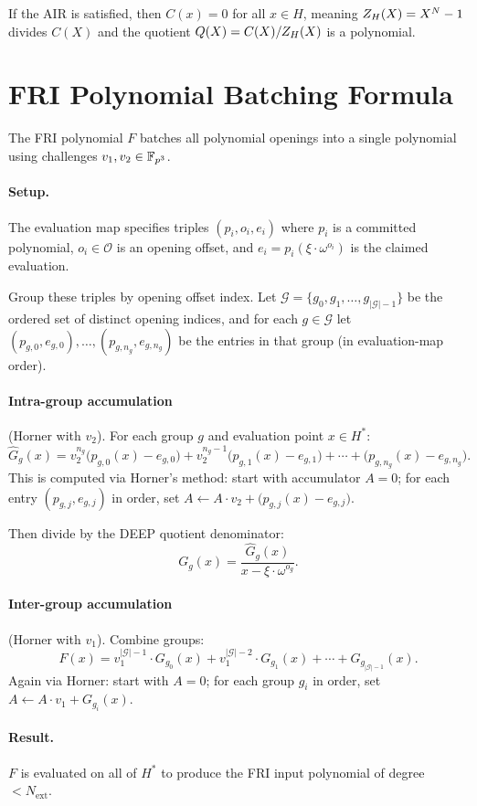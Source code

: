If the AIR is satisfied, then $C(x) = 0$ for all $x \in H$,
meaning $Z_H(X) = X^N - 1$ divides $C(X)$ and
the quotient $Q(X) = C(X)/Z_H(X)$ is a polynomial.

\section{FRI Polynomial Batching Formula}
\label{app:batching}

The FRI polynomial $F$ batches all polynomial openings into a single polynomial
using challenges $v_1, v_2 \in \mathbb{F}_{p^3}$.

\paragraph{Setup.}
The evaluation map specifies triples $(p_i, o_i, e_i)$ where
$p_i$ is a committed polynomial,
$o_i \in \mathcal{O}$ is an opening offset, and
$e_i = p_i(\xi \cdot \omega^{o_i})$ is the claimed evaluation.

Group these triples by opening offset index.
Let $\mathcal{G} = \{g_0, g_1, \ldots, g_{|\mathcal{G}|-1}\}$
be the ordered set of distinct opening indices,
and for each $g \in \mathcal{G}$ let
$(p_{g,0}, e_{g,0}), \ldots, (p_{g,n_g}, e_{g,n_g})$
be the entries in that group (in evaluation-map order).

\paragraph{Intra-group accumulation} (Horner with $v_2$).
For each group $g$ and evaluation point $x \in H^*$:
\begin{equation}
  \label{eq:intra-group}
  \hat{G}_g(x)
  = v_2^{n_g}\bigl(p_{g,0}(x) - e_{g,0}\bigr)
  + v_2^{n_g-1}\bigl(p_{g,1}(x) - e_{g,1}\bigr)
  + \cdots
  + \bigl(p_{g,n_g}(x) - e_{g,n_g}\bigr).
\end{equation}
This is computed via Horner's method:
start with accumulator $A = 0$;
for each entry $(p_{g,j}, e_{g,j})$ in order,
set $A \leftarrow A \cdot v_2 + \bigl(p_{g,j}(x) - e_{g,j}\bigr)$.

Then divide by the DEEP quotient denominator:
\[
  G_g(x) = \frac{\hat{G}_g(x)}{x - \xi \cdot \omega^{o_g}}.
\]

\paragraph{Inter-group accumulation} (Horner with $v_1$).
Combine groups:
\begin{equation}
  \label{eq:inter-group}
  F(x) = v_1^{|\mathcal{G}|-1} \cdot G_{g_0}(x)
       + v_1^{|\mathcal{G}|-2} \cdot G_{g_1}(x)
       + \cdots
       + G_{g_{|\mathcal{G}|-1}}(x).
\end{equation}
Again via Horner: start with $A = 0$;
for each group $g_i$ in order,
set $A \leftarrow A \cdot v_1 + G_{g_i}(x)$.

\paragraph{Result.}
$F$ is evaluated on all of $H^*$ to produce the FRI input polynomial of
degree $< N_{\mathrm{ext}}$.

